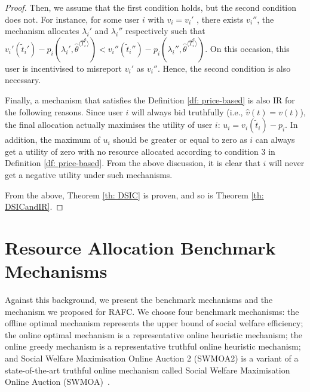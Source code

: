 \documentclass[11pt]{phdthesis}
\begin{document}
\begin{proof}
    Then, we assume that the first condition holds, but the second condition does not. For instance, for some user $ i $ with $ v_i = v_i'$ , there exists $v_i''$, the mechanism allocates $\lambda_i'$ and $\lambda_i''$ respectively such that $v_i' (\tilde{t}_i') - p_i(\lambda_i', \hat{\theta}^{\langle \hat{T}_i^a \rangle}) < v_i'' (\tilde{t}_i'') - p_i(\lambda_i'', \hat{\theta}^{\langle \hat{T}_i^a \rangle}) $. On this occasion, this user is incentivised to misreport  $v_i'$ as $ v_i'' $. Hence, the second condition is also necessary.
    
    Finally, a mechanism that satisfies the Definition \ref{df: price-based} is also IR for the following reasons. Since user $ i $ will always bid truthfully (i.e., $ \hat{v}(t) = v(t) $), the final allocation actually maximises the utility of user $i$: $ u_i = v_i(\tilde{t}_i)-p_i$. In addition, the maximum of $ u_i $ should be greater or equal to zero as $i$ can always get a utility of zero with no resource allocated according to condition 3 in Definition \ref{df: price-based}. From the above discussion, it is clear that $i$ will never get a negative utility under such mechanisms.
    
    From the above, Theorem \ref{th: DSIC} is proven, and so is Theorem \ref{th: DSICandIR}.
\end{proof}

\section{Resource Allocation Benchmark Mechanisms} \label{benchmarks}


Against this background, we present the benchmark mechanisms and the mechanism we proposed for RAFC. We choose four benchmark mechanisms: the offline optimal mechanism represents the upper bound of social welfare efficiency; the online optimal mechanism is a representative online heuristic mechanism; the online greedy mechanism is a representative truthful online heuristic mechanism; and Social Welfare Maximisation Online Auction 2 (SWMOA2) is a variant of a state-of-the-art truthful online mechanism called Social Welfare Maximisation Online Auction (SWMOA)~\citep{shi2017online}. 
\end{document}
